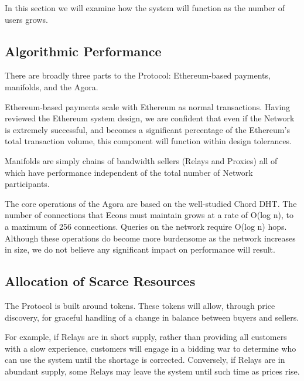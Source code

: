 
In this section we will examine how the system will function as the
number of users grows.

\subsection{Algorithmic Performance}

There are broadly three parts to the \Orchid{} Protocol: Ethereum-based
payments, manifolds, and the Agora.

Ethereum-based payments scale with Ethereum as normal transactions.
Having reviewed the Ethereum system design, we are confident that even
if the \Orchid{} Network is extremely successful, and becomes a
significant percentage of the Ethereum's total transaction volume,
this component will function within design tolerances.

Manifolds are simply chains of bandwidth sellers (Relays and Proxies)
all of which have performance independent of the total number of
\Orchid{} Network participants.

The core operations of the Agora are based on the well-studied Chord
DHT. The number of connections that Econs must maintain grows at a
rate of O(log n), to a maximum of 256 connections. Queries on the
network require O(log n) hops. Although these operations do become
more burdensome as the network increases in size, we do not believe
any significant impact on performance will result.

\subsection{Allocation of Scarce Resources}

The \Orchid{} Protocol is built around tokens. These tokens will allow,
through price discovery, for graceful handling of a change in balance
between buyers and sellers.

For example, if Relays are in short supply, rather than providing all
customers with a slow experience, customers will engage in a bidding
war to determine who can use the system until the shortage is
corrected. Conversely, if Relays are in abundant supply, some Relays
may leave the system until such time as prices rise.

